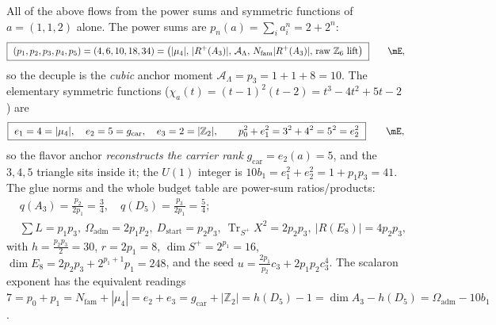 \documentclass[11pt,a4paper]{article}
\newcommand{\gcar}{g_{\mathrm{car}}}
\newcommand{\Nfam}{N_{\mathrm{fam}}}
\newcommand{\Oadm}{\Omega_{\mathrm{adm}}}
\newcommand{\cthree}{c_3}
\newcommand{\useed}{u}
\newcommand{\AL}{\mathcal A_\Lambda}
\newcommand{\Dstart}{D_{\mathrm{start}}}
\theoremstyle{definition}
\begin{document}
All of the above flows from the power sums and symmetric functions of $a=(1,1,2)$ alone. The power
sums are $p_n(a)=\sum_i a_i^n=2+2^n$:
\begin{equation}
  \boxed{\ (p_1,p_2,p_3,p_4,p_5)=(4,6,10,18,34)=\bigl(|\mu_4|,\,|R^+(A_3)|,\,\AL,\,\Nfam|R^+(A_3)|,\,\text{raw }\mathbb Z_6\text{ lift}\bigr)\ }\qquad\mE ,
\end{equation}
so the decuple is the \emph{cubic} anchor moment $\AL=p_3=1{+}1{+}8=10$. The elementary symmetric
functions ($\chi_a(t)=(t-1)^2(t-2)=t^3-4t^2+5t-2$) are
\begin{equation}
  \boxed{\ e_1=4=|\mu_4|,\quad e_2=5=\gcar,\quad e_3=2=|\mathbb Z_2|,\qquad p_0^2+e_1^2=3^2+4^2=5^2=e_2^2\ }\qquad\mE ,
\end{equation}
so the flavor anchor \emph{reconstructs the carrier rank} $\gcar=e_2(a)=5$, and the $3,4,5$ triangle
sits inside it; the $U(1)$ integer is $10b_1=e_1^2+e_2^2=1+p_1p_3=41$. The glue norms and the whole
budget table are power-sum ratios/products:
\begin{equation}
\begin{aligned}
  &q(A_3)=\frac{p_2}{2p_1}=\frac34,\quad q(D_5)=\frac{p_3}{2p_1}=\frac54;\\
  &\sum L=p_1p_3,\ \Oadm=2p_1p_2,\ \Dstart=p_2p_3,\ \operatorname{Tr}_{S^+}X^2=2p_2p_3,\ |R(E_8)|=4p_2p_3,
\end{aligned}
\end{equation}
with $h=\tfrac{p_2p_3}{2}=30$, $r=2p_1=8$, $\dim S^+=2^{p_1}=16$, $\dim E_8=2p_2p_3+2^{p_1+1}p_1=248$,
and the seed $\useed=\tfrac{2p_1}{p_2}\cthree+2p_1p_2\cthree^4$. The scalaron exponent has the equivalent
readings $7=p_0+p_1=\Nfam+|\mu_4|=e_2+e_3=\gcar+|\mathbb Z_2|=h(D_5)-1=\dim A_3-h(D_5)=\Oadm-10b_1$. \mE
\end{document}
